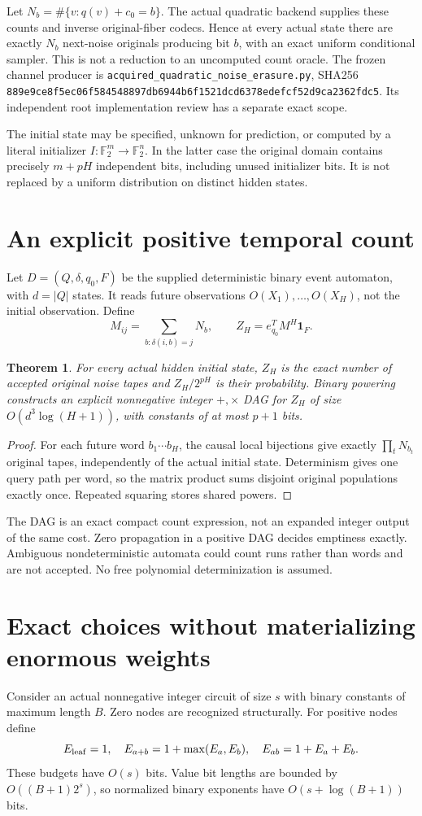 \documentclass[11pt]{article}
\newtheorem{theorem}{Theorem}\newtheorem{lemma}[theorem]{Lemma}
\newcommand{\F}{\mathbb F_2}
\begin{document}
Let $N_b=\#\{v:q(v)+c_0=b\}$. The actual quadratic backend supplies these counts
and inverse original-fiber codecs. Hence at every actual state there are
exactly $N_b$ next-noise originals producing bit $b$, with an exact uniform
conditional sampler. This is not a reduction to an uncomputed count oracle.
The frozen channel producer is
\nolinkurl{acquired_quadratic_noise_erasure.py}, SHA256
\nolinkurl{889e9ce8f5ec06f584548897db6944b6f1521dcd6378edefcf52d9ca2362fdc5}.
Its independent root implementation review has a separate exact scope.

The initial state may be specified, unknown for prediction, or computed by a
literal initializer $I:\F^m\to\F^n$. In the latter case the original domain
contains precisely $m+pH$ independent bits, including unused initializer bits.
It is not replaced by a uniform distribution on distinct hidden states.

\section{An explicit positive temporal count}
Let $D=(Q,\delta,q_0,F)$ be the supplied deterministic binary event automaton,
with $d=|Q|$ states. It reads future observations $O(X_1),\ldots,O(X_H)$,
not the initial observation. Define
\[
 M_{ij}=\sum_{b:\delta(i,b)=j}N_b,\qquad
                       Z_H=e_{q_0}^TM^H\mathbf1_F.              \tag{2}
\]
\begin{theorem}
For every actual hidden initial state, $Z_H$ is the exact number of accepted
original noise tapes and $Z_H/2^{pH}$ is their probability. Binary powering
constructs an explicit nonnegative integer $+,\times$ DAG for $Z_H$ of size
$O(d^3\log(H+1))$, with constants of at most $p+1$ bits.
\end{theorem}
\begin{proof}
For each future word $b_1\cdots b_H$, the causal local bijections give exactly
$\prod_tN_{b_t}$ original tapes, independently of the actual initial state.
Determinism gives one query path per word, so the matrix product sums disjoint
original populations exactly once. Repeated squaring stores shared powers.
\end{proof}
The DAG is an exact compact count expression, not an expanded integer output
of the same cost. Zero propagation in a positive DAG decides emptiness exactly.
Ambiguous nondeterministic automata could count runs rather than words and are
not accepted. No free polynomial determinization is assumed.

\section{Exact choices without materializing enormous weights}
Consider an actual nonnegative integer circuit of size $s$ with binary
constants of maximum length $B$. Zero nodes are recognized structurally.
For positive nodes define
\[
 E_{\rm leaf}=1,\quad E_{a+b}=1+\max(E_a,E_b),\quad
 E_{ab}=1+E_a+E_b.
\]
These budgets have $O(s)$ bits. Value bit lengths are bounded by
$O((B+1)2^s)$, so normalized binary exponents have $O(s+\log(B+1))$ bits.
\end{document}

